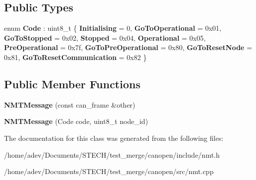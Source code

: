 \subsection*{Public Types}
\begin{DoxyCompactItemize}
\item 
\mbox{\label{class_c_a_nopen_1_1_n_m_t_message_a20257f9fc32b84adc9196fd436f15e95}} 
enum {\bfseries Code} \+: uint8\+\_\+t \{ \newline
{\bfseries Initialising} = 0, 
{\bfseries Go\+To\+Operational} = 0x01, 
{\bfseries Go\+To\+Stopped} = 0x02, 
{\bfseries Stopped} = 0x04, 
\newline
{\bfseries Operational} = 0x05, 
{\bfseries Pre\+Operational} = 0x7f, 
{\bfseries Go\+To\+Pre\+Operational} = 0x80, 
{\bfseries Go\+To\+Reset\+Node} = 0x81, 
\newline
{\bfseries Go\+To\+Reset\+Communication} = 0x82
 \}
\end{DoxyCompactItemize}
\subsection*{Public Member Functions}
\begin{DoxyCompactItemize}
\item 
\mbox{\label{class_c_a_nopen_1_1_n_m_t_message_ae691342a23d0bffa2a98861099c19fcc}} 
{\bfseries N\+M\+T\+Message} (const can\+\_\+frame \&other)
\item 
\mbox{\label{class_c_a_nopen_1_1_n_m_t_message_a5939adf6f14706495b9e734f8412f5d4}} 
{\bfseries N\+M\+T\+Message} (Code code, uint8\+\_\+t node\+\_\+id)
\end{DoxyCompactItemize}


The documentation for this class was generated from the following files\+:\begin{DoxyCompactItemize}
\item 
/home/adev/\+Documents/\+S\+T\+E\+C\+H/test\+\_\+merge/canopen/include/nmt.\+h\item 
/home/adev/\+Documents/\+S\+T\+E\+C\+H/test\+\_\+merge/canopen/src/nmt.\+cpp\end{DoxyCompactItemize}
